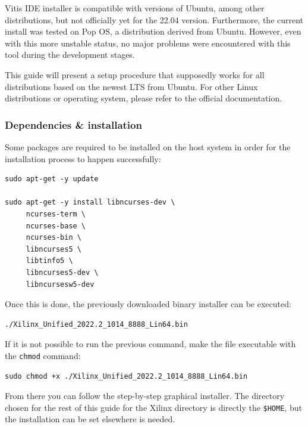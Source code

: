 \documentclass[10pt]{article}
\begin{document}
Vitis IDE installer is compatible with versions of Ubuntu, among other distributions,
but not officially yet for the 22.04 version.
Furthermore, the current install was tested on Pop OS, a distribution derived from Ubuntu.
However, even with this more unstable status, no major problems were encountered
with this tool during the development stages.

This guide will present a setup procedure that supposedly works for all distributions based on the newest
LTS from Ubuntu. For other Linux distributions or operating system, please refer to the official documentation.

\subsubsection{Dependencies \& installation}
\label{sec:org73004a5}
Some packages are required to be installed on the host system
in order for the installation process to happen successfully:

\begin{verbatim}
sudo apt-get -y update

sudo apt-get -y install libncurses-dev \
     ncurses-term \
     ncurses-base \
     ncurses-bin \
     libncurses5 \
     libtinfo5 \
     libncurses5-dev \
     libncursesw5-dev
\end{verbatim}

Once this is done, the previously downloaded binary installer can be executed:

\begin{verbatim}
./Xilinx_Unified_2022.2_1014_8888_Lin64.bin
\end{verbatim}

If it is not possible to run the previous command, make the file executable with the \texttt{chmod} command:

\begin{verbatim}
sudo chmod +x ./Xilinx_Unified_2022.2_1014_8888_Lin64.bin
\end{verbatim}

From there you can follow the step-by-step graphical installer.
The directory chosen for the rest of this guide for the Xilinx directory
is directly the \texttt{\$HOME}, but the installation can be set elsewhere is needed.
\end{document}
